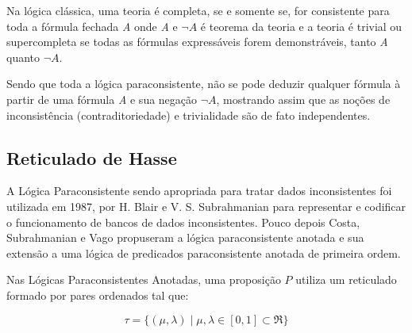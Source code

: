 Na lógica clássica, 
uma teoria é completa, 
se e somente se, for consistente para toda a fórmula fechada \emph{A} 
onde \emph{A} e \emph{$\neg A$} é teorema da teoria 
e a teoria é trivial ou supercompleta se todas as fórmulas expressáveis forem demonstráveis, 
tanto \emph{A} quanto \emph{$ \neg A$}.


Sendo que toda a lógica paraconsistente, 
não se pode deduzir qualquer fórmula à partir de uma fórmula \emph{A} e sua negação \emph{$\neg A$}, 
mostrando assim que as noções de inconsistência (contraditoriedade) e trivialidade são de fato independentes.







\subsection{Reticulado de Hasse}

A Lógica Paraconsistente sendo apropriada para tratar dados inconsistentes foi utilizada em 1987, 
por H. Blair e V. S. Subrahmanian para representar e codificar o funcionamento de bancos de dados inconsistentes. 
Pouco depois Costa, Subrahmanian e Vago propuseram a lógica paraconsistente anotada e sua extensão a uma lógica de predicados paraconsistente anotada de primeira ordem. 

Nas Lógicas Paraconsistentes Anotadas, uma proposição $P$ utiliza um reticulado formado por pares ordenados tal que: 

\begin{center}
\begin{equation}
\tau = \{ ( \mu , \lambda ) \mid \mu ,\lambda \in [0,1] \subset \Re \}
\end{equation}
\end{center}

